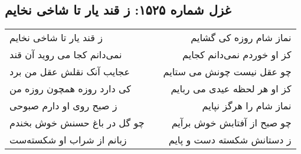 \begin{center}
\section*{غزل شماره ۱۵۲۵: ز قند یار تا شاخی نخایم}
\label{sec:1525}
\begin{longtable}{l p{0.5cm} r}
ز قند یار تا شاخی نخایم
&&
نماز شام روزه کی گشایم
\\
نمی‌دانم کجا می روید آن قند
&&
کز او خوردم نمی‌دانم کجایم
\\
عجایب آنک نقلش عقل من برد
&&
چو عقل نیست چونش می ستایم
\\
کی دارد روزه همچون روزه من
&&
کز او هر لحظه عیدی می ربایم
\\
ز صبح روی او دارم صبوحی
&&
نماز شام را هرگز نپایم
\\
چو گل در باغ حسنش خوش بخندم
&&
چو صبح از آفتابش خوش برآیم
\\
زبانم از شراب او شکسته‌ست
&&
ز دستانش شکسته دست و پایم
\\
\end{longtable}
\end{center}
